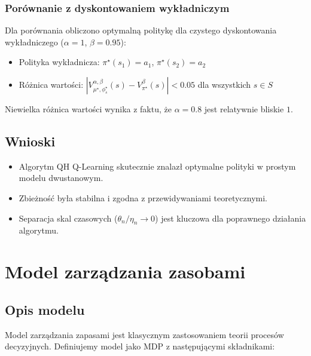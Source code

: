 \subsubsection{Porównanie z dyskontowaniem wykładniczym}

Dla porównania obliczono optymalną politykę dla czystego dyskontowania wykładniczego ($\alpha = 1$, $\beta = 0.95$):

\begin{itemize}
\item Polityka wykładnicza: $\pi^\star(s_1) = a_1$, $\pi^\star(s_2) = a_2$
\item Różnica wartości: $|V^{\alpha,\beta}_{\mu^\star,\phi_s^\star}(s) - V^{\beta}_{\pi^\star}(s)| < 0.05$ dla wszystkich $s \in S$
\end{itemize}

Niewielka różnica wartości wynika z faktu, że $\alpha = 0.8$ jest relatywnie bliskie $1$.

\subsection{Wnioski}

\begin{itemize}
\item Algorytm QH Q-Learning skutecznie znalazł optymalne polityki w prostym modelu dwustanowym.
\item Zbieżność była stabilna i zgodna z przewidywaniami teoretycznymi.
\item Separacja skal czasowych ($\theta_n / \eta_n \to 0$) jest kluczowa dla poprawnego działania algorytmu.
\end{itemize}

\section{Model zarządzania zasobami}

\subsection{Opis modelu}

Model zarządzania zapasami jest klasycznym zastosowaniem teorii procesów decyzyjnych. Definiujemy model jako MDP z następującymi składnikami:

